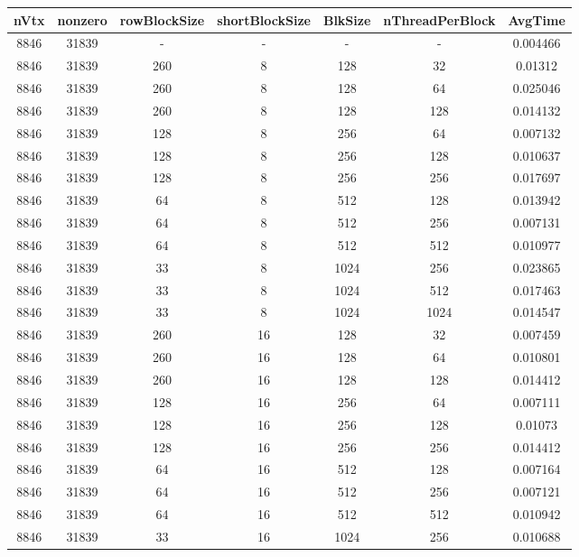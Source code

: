 \documentclass[9pt]{article}
\begin{document}
\SetBgPosition{0.25cm,-5.0cm}
\begin{tabular}{|c|c|c|c|c|c|c| }  
\hline
nVtx  & nonzero  & rowBlockSize  & shortBlockSize  & BlkSize  & nThreadPerBlock  & AvgTime \\
\hline
8846  & 31839  &  -  & -  & -  & -  &0.004466 \\
\hline
8846  & 31839  & 260  & 8  & 128  & 32  & 0.01312 \\
\hline
8846  & 31839  & 260  & 8  & 128  & 64  & 0.025046 \\
\hline
8846  & 31839  & 260  & 8  & 128  & 128  & 0.014132 \\
\hline
8846  & 31839  & 128  & 8  & 256  & 64  & 0.007132 \\
\hline
8846  & 31839  & 128  & 8  & 256  & 128  & 0.010637 \\
\hline
8846  & 31839  & 128  & 8  & 256  & 256  & 0.017697 \\
\hline
8846  & 31839  & 64  & 8  & 512  & 128  & 0.013942 \\
\hline
8846  & 31839  & 64  & 8  & 512  & 256  & 0.007131 \\
\hline
8846  & 31839  & 64  & 8  & 512  & 512  & 0.010977 \\
\hline
8846  & 31839  & 33  & 8  & 1024  & 256  & 0.023865 \\
\hline
8846  & 31839  & 33  & 8  & 1024  & 512  & 0.017463 \\
\hline
8846  & 31839  & 33  & 8  & 1024  & 1024  & 0.014547 \\
\hline
8846  & 31839  & 260  & 16  & 128  & 32  & 0.007459 \\
\hline
8846  & 31839  & 260  & 16  & 128  & 64  & 0.010801 \\
\hline
8846  & 31839  & 260  & 16  & 128  & 128  & 0.014412 \\
\hline
8846  & 31839  & 128  & 16  & 256  & 64  & 0.007111 \\
\hline
8846  & 31839  & 128  & 16  & 256  & 128  & 0.01073 \\
\hline
8846  & 31839  & 128  & 16  & 256  & 256  & 0.014412 \\
\hline
8846  & 31839  & 64  & 16  & 512  & 128  & 0.007164 \\
\hline
8846  & 31839  & 64  & 16  & 512  & 256  & 0.007121 \\
\hline
8846  & 31839  & 64  & 16  & 512  & 512  & 0.010942 \\
\hline
8846  & 31839  & 33  & 16  & 1024  & 256  & 0.010688 \\

\end{tabular}
\end{document}
